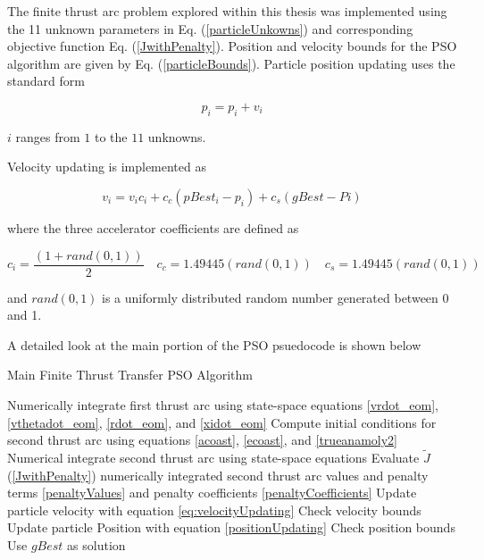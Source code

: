 \noindent The finite thrust arc problem explored within this thesis was implemented using the 11 unknown parameters in Eq. (\ref{particleUnkowns})
and corresponding objective function Eq. (\ref{JwithPenalty}). Position and velocity bounds for the PSO algorithm are given by Eq. (\ref{particleBounds}). Particle position updating uses 
the standard form

\begin{equation}
    \label{positionUpdating}
p_i = p_i+v_i
\end{equation}

\noindent $i$ ranges from $1$ to the $11$ unknowns. \newline

\noindent Velocity updating is implemented as

\begin{equation}
    \label{eq:velocityUpdating}
v_i = v_ic_i+c_c(pBest_i-p_i)+c_s(gBest-Pi)
\end{equation}

\noindent where the three accelerator coefficients are defined as

\begin{equation}
    \label{eq:acceleratorCoefficients}
c_i = \dfrac{(1+rand(0,1))}{2} \quad c_c = 1.49445(rand(0,1)) \quad c_s = 1.49445(rand(0,1))
\end{equation}

\noindent and $rand(0,1)$ is a uniformly distributed random number generated between 0 and 1. \newline

\noindent A detailed look at the main portion of the PSO psuedocode is shown below

\begin{algorithm}[H]
    \caption{Main Finite Thrust Transfer PSO Algorithm}
    \begin{algorithmic}

    \STATE Numerically integrate first thrust arc using state-space equations \ref{vrdot_eom},
    \ref{vthetadot_eom}, \ref{rdot_eom}, and \ref{xidot_eom}
    \STATE Compute initial conditions for second thrust arc using equations \ref{acoast}, \ref{ecoast}, and \ref{trueanamoly2}
    \STATE Numerical integrate second thrust arc using state-space equations
    \STATE Evaluate $\tilde{J}$ (\ref{JwithPenalty}) numerically integrated second thrust arc values and penalty terms \ref{penaltyValues} and
    penalty coefficients \ref{penaltyCoefficients}
    \ENDFOR
    \STATE Update particle velocity with equation \ref{eq:velocityUpdating}
    \STATE Check velocity bounds
    \STATE Update particle Position with equation \ref{positionUpdating}
    \STATE Check position bounds
    \ENDFOR
    \ENDFOR
    \STATE Use $gBest$ as solution
    \end{algorithmic}
    \label{alg:PSOfThrustMain}

\end{algorithm}


